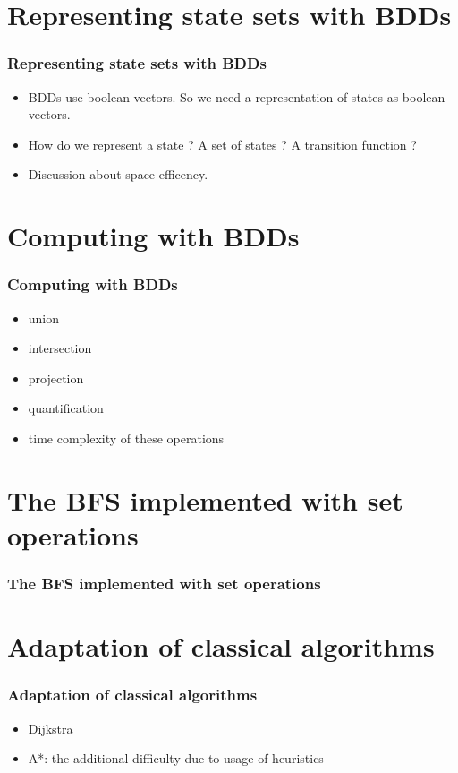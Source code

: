 \documentclass[10pt,a4paper]{beamer}
\begin{document}
\section{Representing  state sets with BDDs}
\begin{frame}
\frametitle{Representing  state sets with BDDs}
	\begin{itemize}
	\item BDDs use boolean vectors.  So we need a representation of states as boolean vectors.
	\item How do we represent a state ? A set of states ? A transition function ?
	\item Discussion about space efficency.
	\end{itemize}
\end{frame}

\section{Computing with BDDs}
\begin{frame}
\frametitle{Computing with BDDs}

\begin{itemize}
\item union
\item intersection
\item projection
\item quantification
\item time complexity of these operations
\end{itemize}

\end{frame}

\section{The BFS implemented with set operations}
\begin{frame}
\frametitle{The BFS implemented with set operations}
\end{frame}

\section{Adaptation of classical algorithms}
\begin{frame}
\frametitle{Adaptation of classical algorithms}

	\begin{itemize}
	\item Dijkstra
	\item A*: the additional difficulty due to usage of heuristics
	\end{itemize}
\end{frame}
\end{document}
